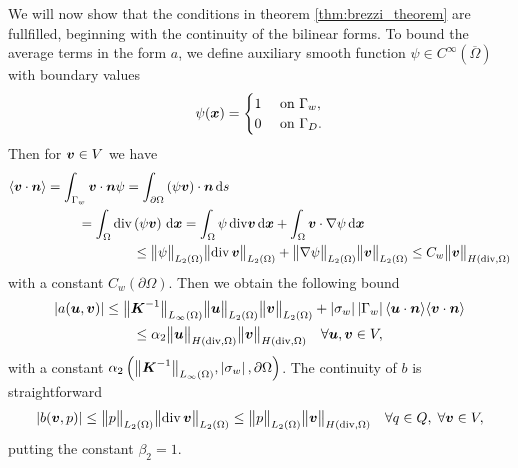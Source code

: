We will now show that the conditions in theorem \eqref{thm:brezzi_theorem} are fullfilled,
beginning with the continuity of the bilinear forms.
To bound the average terms in the form $a$,
we define auxiliary smooth function $\psi\in C^{\infty}(\overbar\Omega)$ with boundary values
\begin{equation*}
  \psi(\bx) =
  \begin{cases}
    1 & \textrm{ on } \Gamma_w, \\
    0 & \textrm{ on } \Gamma_D.
  \end{cases} \nonumber
\end{equation*}
Then for $\vc v\in V$ we have
\begin{align*}
  \avg{\vc v \cdot\vc n} = \int_{\Gamma_w} \vc v \cdot\vc n \psi = 
    \int_{\partial\Omega} \left( \psi \vc v \right) \cdot\vc n \dd s & \\
    = \int_{\Omega} \div\left( \psi \vc v \right) \dd\bx
    = \int_{\Omega} \psi\, &\div \vc v \dd\bx + \int_{\Omega} \vc v \cdot \grad\psi \dd\bx \\
    \leq \norm{\psi}_{L_2(\Omega)} \norm{\div&\,\vc v}_{L_2(\Omega)} + \norm{\grad\psi}_{L_2(\Omega)} \norm{\vc v}_{L_2(\Omega)}
    \leq C_w \norm{\vc v}_{H(\div,\Omega)}
\end{align*}
with a constant $C_w(\partial\Omega)$. Then we obtain the following bound
\begin{multline}
    \abs{a(\vc u,\vc v)} \leq \norm{\vc K^{-1}}_{L_\infty(\Omega)} \norm{\vc u}_{L_2(\Omega)} \norm{\vc v}_{L_2(\Omega)}
        + \abs{\sigma_w} \abs{\Gamma_w} \avg{\vc u\cdot\vc n} \avg{\vc v\cdot\vc n}\\
        \leq \alpha_2 \norm{\vc u}_{H(\div,\Omega)} \norm{\vc v}_{H(\div,\Omega)} \quad \forall \vc u,\vc v\in V,
\end{multline}
with a constant $\alpha_2 \left(\norm{\vc K^{-1}}_{L_\infty(\Omega)}, \abs{\sigma_w}, \partial\Omega\right)$.
The continuity of $b$ is straightforward
\begin{multline}
    \abs{b(\vc v,p)} \leq \norm{p}_{L_2(\Omega)} \norm{\div\,\vc v}_{L_2(\Omega)}
        \leq \norm{p}_{L_2(\Omega)} \norm{\vc v}_{H(\div,\Omega)} \quad \forall q\in Q,\;\forall \vc v\in V, \\
\end{multline}
putting the constant $\beta_2=1$.

